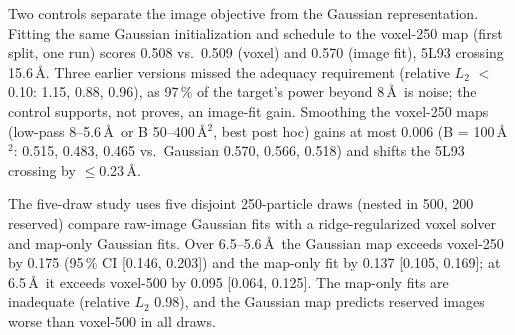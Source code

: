 Two controls separate the image objective from the Gaussian representation. Fitting the same Gaussian initialization and schedule to the voxel-250 map (first split, one run) scores 0.508 vs.\ 0.509 (voxel) and 0.570 (image fit), 5L93 crossing 15.6\,\AA.
Three earlier versions missed the adequacy requirement (relative $L_2$ $<$0.10: 1.15, 0.88, 0.96), as 97\,\% of the target's power beyond 8\,\AA\ is noise; the control supports, not proves, an image-fit gain.
Smoothing the voxel-250 maps (low-pass 8--5.6\,\AA\ or B 50--400\,\AA$^2$, best post hoc) gains at most 0.006 (B = 100\,\AA$^2$: 0.515, 0.483, 0.465 vs.\ Gaussian 0.570, 0.566, 0.518) and shifts the 5L93 crossing by $\le$0.23\,\AA.

The five-draw study uses five disjoint 250-particle draws (nested in 500, 200 reserved) compare raw-image Gaussian fits with a ridge-regularized voxel solver and map-only Gaussian fits.
Over 6.5--5.6\,\AA\ the Gaussian map exceeds voxel-250 by 0.175 (95\,\% CI [0.146, 0.203]) and the map-only fit by 0.137 [0.105, 0.169]; at 6.5\,\AA\ it exceeds voxel-500 by 0.095 [0.064, 0.125].
The map-only fits are inadequate (relative $L_2$ 0.98), and the Gaussian map predicts reserved images worse than voxel-500 in all draws.


